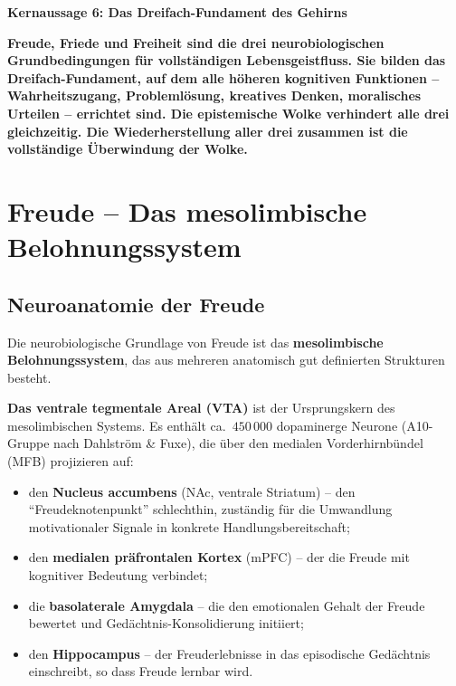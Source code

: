 ﻿\documentclass[12pt,a4paper]{report}
\theoremstyle{plain}
\theoremstyle{definition}
\theoremstyle{remark}
\begin{document}
	
	\noindent\textbf{Kernaussage 6: Das Dreifach-Fundament des Gehirns}

		\textbf{Freude, Friede und Freiheit sind die drei neurobiologischen
		Grundbedingungen für vollständigen Lebensgeistfluss.
		Sie bilden das Dreifach-Fundament, auf dem alle höheren kognitiven
		Funktionen -- Wahrheitszugang, Problemlösung, kreatives Denken,
		moralisches Urteilen -- errichtet sind.
		Die epistemische Wolke verhindert alle drei gleichzeitig.
		Die Wiederherstellung aller drei zusammen ist die vollständige
		Überwindung der Wolke.}


	\section{Freude -- Das mesolimbische Belohnungssystem}

	\subsection{Neuroanatomie der Freude}

	Die neurobiologische Grundlage von Freude ist das
	\textbf{mesolimbische Belohnungssystem}, das aus mehreren anatomisch
	gut definierten Strukturen besteht.

	\textbf{Das ventrale tegmentale Areal (VTA)} ist der Ursprungskern
	des mesolimbischen Systems. Es enthält ca.\ $450\,000$ dopaminerge
	Neurone (A10-Gruppe nach Dahlström \& Fuxe), die über den medialen
	Vorderhirnbündel (MFB) projizieren auf:
	\begin{itemize}
		\item den \textbf{Nucleus accumbens} (NAc, ventrale Striatum) --
		den ``Freudeknotenpunkt'' schlechthin, zuständig für die
		Umwandlung motivationaler Signale in konkrete Handlungsbereitschaft;
		\item den \textbf{medialen präfrontalen Kortex} (mPFC) --
		der die Freude mit kognitiver Bedeutung verbindet;
		\item die \textbf{basolaterale Amygdala} -- die den emotionalen
		Gehalt der Freude bewertet und Gedächtnis-Konsolidierung initiiert;
		\item den \textbf{Hippocampus} -- der Freuderlebnisse in das
		episodische Gedächtnis einschreibt, so dass Freude lernbar wird.
	\end{itemize}
\end{document}
